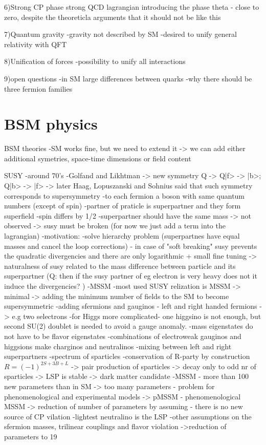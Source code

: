 6)Strong CP phase
strong QCD lagrangian introducing the phase theta - close to zero, despite the theoreticla arguments that it should not be like this

7)Quantum gravity
-gravity not described by SM
-desired to unify general relativity with QFT

8)Unification of forces
-possibility to unify all interactions

9)open questions
-in SM large differences between quarks
-why there should be three fermion families


\section{BSM physics}

BSM theories
-SM works fine, but we need to extend it -> we can add either additional symetries, space-time dimensions or field content

SUSY
-around 70's
-Golfand and Likhtman -> new symmetry Q -> Q|f> -> |b>; Q|b> -> |f> -> later Haag, Lopuszanski and Sohnius said that such symmetry corresponds to supersymmetry
-to each fermion a boson  with same quantum numbers (except of spin)
-partner of praticle is superpartner and they form superfield
-spin differs by 1/2
-superpartner should have the same mass -> not observed -> susy must be broken (for now we just add a term into the lagrangian)
-motivation:
	-solve hierarchy problem (superpartnes have equal masses and cancel the loop corrections) - in case of "soft breaking" susy prevents the quadratic divergencies and there are only logarithmic + small fine tuning
	-> naturalness of susy related to the mass difference between particle and its superpartner (Q: then if the susy partner of eg electron is very heavy does not it induce the divergencies? )
-MSSM
-most used SUSY relization is MSSM -> minimal -> adding the minimum number of fields to the SM to become supersymmetric
-adding sfermions and gauginos - left and right handed fermions -> e.g two selectrons
-for Higgs more complicated- one higgsino is not enough, but second SU(2) doublet is needed to avoid a gauge anomaly.
-mass eigenstates do not have to be flavor eigenstates
-combinations of electroweak gauginos and higgsions make charginos and neutralinos
-mixing between left and right superpartners 
-spectrum of sparticles
-conservation of R-party by construction $R=(-1)^{2S+3B+L} $
	-> pair production of sparticles
        -> decay only to odd nr of sparticles
        -> LSP is stable -> dark matter candidate
-MSSM - more than 100 new parameters than in SM
-> too many parameters - problem for phenomenological and experimental models
-> pMSSM - phenomenological MSSM -> reduction of number of parameters by assuming
	- there is no new source of CP vilation
	-lightest neutralino is the LSP
	-other assumptions on the sfermion masses, trilinear couplings and flavor violation
	->reduction of parameters to 19
